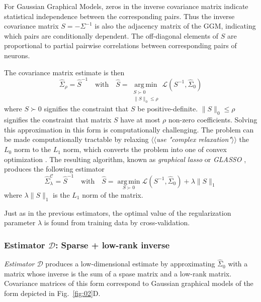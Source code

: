 \documentclass[10pt]{article}
\newcommand{\loss}[1]{\mathcal L\left(#1\right)}
\newcommand{\TODO}[1]{\emph{\small\color{blue}$\langle\langle$#1$\rangle\rangle$}}
\DeclareMathOperator*{\argmin}{arg\,min}
\begin{document}
For Gaussian Graphical Models, zeros in the inverse covariance matrix indicate statistical independence between the corresponding pairs. Thus the inverse covariance matrix $S=-\Sigma^{-1}$ is also the adjacency matrix of the GGM, indicating which pairs are conditionally dependent. The off-diagonal elements of $S$ are proportional to partial pairwise correlations between corresponding pairs of neurons. 

The covariance matrix estimate is then 
\begin{equation}
\hat\Sigma_\rho = \hat S^{-1}
\quad\mbox{with}\quad
\hat S = \argmin\limits_{\substack{S\succ 0 \\ \|S\|_0 \le \rho}} \loss{S^{-1},\hat\Sigma_0}   
\end{equation}
where $S\succ 0$ signifies the constraint that $S$ be positive-definite. $\|S\|_0\le\rho$ signifies the constraint  that matrix $S$ have at most $\rho$ non-zero coefficients.
Solving this approximation in this form is computationally challenging. The problem can be made computationally tractable by relaxing \TODO{use "complex relaxation"} the $L_0$ norm to the $L_1$ norm, which converts the problem into one of convex optimization \cite{Donoho:2000}.  The resulting algorithm, known as \emph{graphical lasso} or \emph{GLASSO}  \cite{Meinshausen:2006,Yuan:2007,Banerjee:2008,Friedman:2008}, produces the following estimator  
\begin{equation}
\hat\Sigma_\lambda^\mathcal{C} = \hat S^{-1}
\quad\mbox{with}\quad
\hat S = \argmin\limits_{S\succ 0} \loss{S^{-1},\hat\Sigma_0} + \lambda \|S\|_1
\end{equation}
where $\lambda \|S\|_1$ is the $L_1$ norm of the matrix.

Just as in the previous estimators, the optimal value of the regularization parameter $\lambda$ is found from training data by cross-validation.

\subsubsection*{Estimator $\mathcal D$: Sparse + low-rank inverse}
\emph{Estimator $\mathcal D$} produces a low-dimensional estimate by approximating $\hat\Sigma_0$ with a matrix whose inverse is the sum of a spase matrix and a low-rank matrix. Covariance matrices of this form correspond to Gaussian graphical models of the form depicted in Fig.~\ref{fig:02}D.
\end{document}

